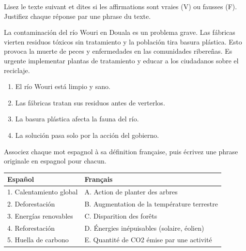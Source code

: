 \documentclass[11pt]{article}
\begin{document}
\begin{exercice}
Lisez le texte suivant et dites si les affirmations sont vraies (V) ou fausses (F). Justifiez chaque réponse par une phrase du texte.
\begin{textebox}
La contaminación del río Wouri en Douala es un problema grave. Las fábricas vierten residuos tóxicos sin tratamiento y la población tira basura plástica. Esto provoca la muerte de peces y enfermedades en las comunidades ribereñas. Es urgente implementar plantas de tratamiento y educar a los ciudadanos sobre el reciclaje.
\end{textebox}
\begin{enumerate}
    \item El río Wouri está limpio y sano.
    \item Las fábricas tratan sus residuos antes de verterlos.
    \item La basura plástica afecta la fauna del río.
    \item La solución pasa solo por la acción del gobierno.
\end{enumerate}
\end{exercice}

\begin{exercice}
Associez chaque mot espagnol à sa définition française, puis écrivez une phrase originale en espagnol pour chacun.
\begin{center}
\begin{tabularx}{\linewidth}{|X|X|}\hline
\rowcolor{popblueL} \textbf{Español} & \textbf{Français} \\ \hline
1. Calentamiento global & A. Action de planter des arbres \\ \hline
2. Deforestación & B. Augmentation de la température terrestre \\ \hline
3. Energías renovables & C. Disparition des forêts \\ \hline
4. Reforestación & D. Énergies inépuisables (solaire, éolien) \\ \hline
5. Huella de carbono & E. Quantité de CO2 émise par une activité \\ \hline
\end{tabularx}
\end{center}
\end{exercice}
\end{document}
